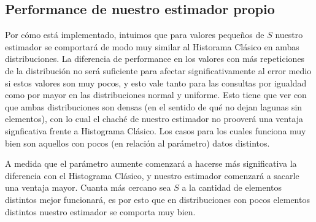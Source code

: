 \subsection{Performance de nuestro estimador propio}
Por cómo está implementado, intuimos que para valores pequeños de $S$ nuestro estimador se comportará de modo muy similar al Historama Clásico en ambas distribuciones. La diferencia de performance en los valores con más repeticiones de la distribución no será suficiente para afectar significativamente al error medio si estos valores son muy pocos, y esto vale tanto para las consultas por igualdad como por mayor en las distribuciones normal y uniforme. Esto tiene que ver con que ambas distribuciones son densas (en el sentido de qué no dejan lagunas sin elementos), con lo cual el chaché de nuestro estimador no prooverá una ventaja signficativa frente a Histograma Clásico. Los casos para los cuales funciona muy bien son aquellos con pocos (en relación al parámetro) datos distintos.

A medida que el parámetro aumente comenzará a hacerse más significativa la diferencia con el Histograma Clásico, y nuestro estimador comenzará a sacarle una ventaja mayor. Cuanta más cercano sea $S$ a la cantidad de elementos distintos mejor funcionará, es por esto que en distribuciones con pocos elementos distintos nuestro estimador se comporta muy bien.

